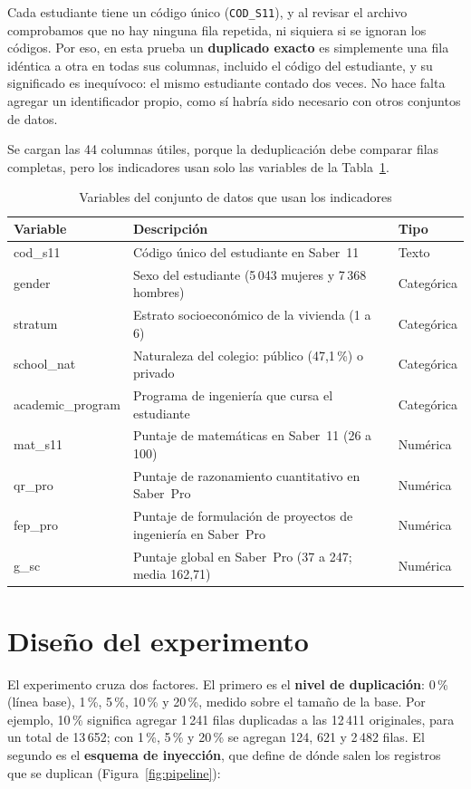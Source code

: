 \documentclass[11pt,openany,oneside,letterpaper]{book}
\begin{document}
Cada estudiante tiene un código único (\texttt{COD\_S11}), y al revisar el archivo comprobamos que no hay ninguna fila repetida, ni siquiera si se ignoran los códigos. Por eso, en esta prueba un \textbf{duplicado exacto} es simplemente una fila idéntica a otra en todas sus columnas, incluido el código del estudiante, y su significado es inequívoco: el mismo estudiante contado dos veces. No hace falta agregar un identificador propio, como sí habría sido necesario con otros conjuntos de datos.

Se cargan las 44 columnas útiles, porque la deduplicación debe comparar filas completas, pero los indicadores usan solo las variables de la Tabla~\ref{tab:variables}.

\begin{table}[H]
\centering
\caption{Variables del conjunto de datos que usan los indicadores}
\label{tab:variables}
\small
\begin{tabularx}{\textwidth}{>{\ttfamily}l X l}
\toprule
\textrm{\textbf{Variable}} & \textbf{Descripción} & \textbf{Tipo} \\
\midrule
cod\_s11 & Código único del estudiante en Saber~11 & Texto \\
gender & Sexo del estudiante (5\,043 mujeres y 7\,368 hombres) & Categórica \\
stratum & Estrato socioeconómico de la vivienda (1 a 6) & Categórica \\
school\_nat & Naturaleza del colegio: público (47,1\,\%) o privado & Categórica \\
academic\_program & Programa de ingeniería que cursa el estudiante & Categórica \\
mat\_s11 & Puntaje de matemáticas en Saber~11 (26 a 100) & Numérica \\
qr\_pro & Puntaje de razonamiento cuantitativo en Saber~Pro & Numérica \\
fep\_pro & Puntaje de formulación de proyectos de ingeniería en Saber~Pro & Numérica \\
g\_sc & Puntaje global en Saber~Pro (37 a 247; media 162,71) & Numérica \\
\bottomrule
\end{tabularx}
\end{table}

\section{Diseño del experimento}

El experimento cruza dos factores. El primero es el \textbf{nivel de duplicación}: 0\,\% (línea base), 1\,\%, 5\,\%, 10\,\% y 20\,\%, medido sobre el tamaño de la base. Por ejemplo, 10\,\% significa agregar 1\,241 filas duplicadas a las 12\,411 originales, para un total de 13\,652; con 1\,\%, 5\,\% y 20\,\% se agregan 124, 621 y 2\,482 filas. El segundo es el \textbf{esquema de inyección}, que define de dónde salen los registros que se duplican (Figura~\ref{fig:pipeline}):
\end{document}
